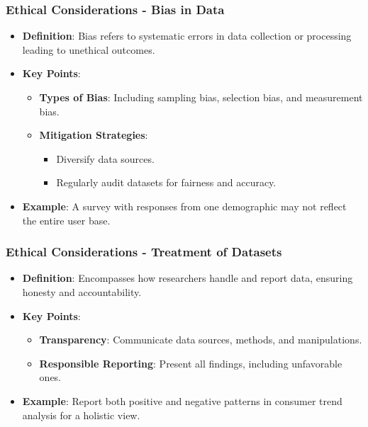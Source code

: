 \documentclass[aspectratio=169]{beamer}
\begin{document}
\begin{frame}[fragile]
    \frametitle{Ethical Considerations - Bias in Data}
    \begin{itemize}
        \item \textbf{Definition}: Bias refers to systematic errors in data collection or processing leading to unethical outcomes.
        \item \textbf{Key Points}:
        \begin{itemize}
            \item \textbf{Types of Bias}: Including sampling bias, selection bias, and measurement bias.
            \item \textbf{Mitigation Strategies}:
            \begin{itemize}
                \item Diversify data sources.
                \item Regularly audit datasets for fairness and accuracy.
            \end{itemize}
        \end{itemize}
        \item \textbf{Example}: A survey with responses from one demographic may not reflect the entire user base.
    \end{itemize}
\end{frame}

\begin{frame}[fragile]
    \frametitle{Ethical Considerations - Treatment of Datasets}
    \begin{itemize}
        \item \textbf{Definition}: Encompasses how researchers handle and report data, ensuring honesty and accountability.
        \item \textbf{Key Points}:
        \begin{itemize}
            \item \textbf{Transparency}: Communicate data sources, methods, and manipulations.
            \item \textbf{Responsible Reporting}: Present all findings, including unfavorable ones.
        \end{itemize}
        \item \textbf{Example}: Report both positive and negative patterns in consumer trend analysis for a holistic view.
    \end{itemize}
\end{frame}
\end{document}
